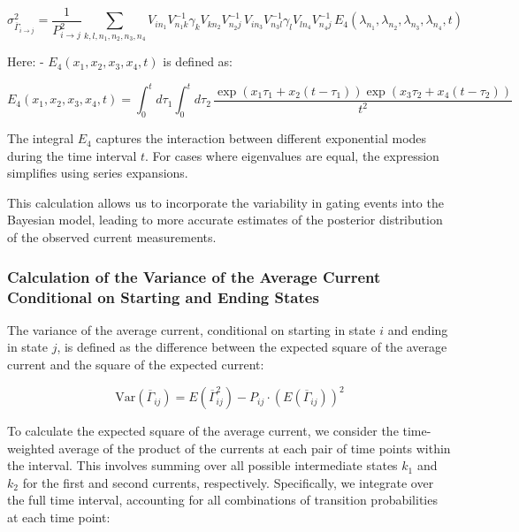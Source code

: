 \documentclass[pdflatex,sn-mathphys-num]{sn-jnl}%
\theoremstyle{thmstyleone}%
\theoremstyle{thmstyletwo}%
\theoremstyle{thmstylethree}%
\begin{document}
\begin{equation}
	\sigma^2_{\overline{\Gamma}_{i \rightarrow j}} = \frac{1}{P_{i \rightarrow j}^2} \sum_{k, l, n_1, n_2, n_3, n_4} V_{i n_1} V^{-1}_{n_1 k} \gamma_k V_{k n_2} V^{-1}_{n_2 j} \, V_{i n_3} V^{-1}_{n_3 l} \gamma_l V_{l n_4} V^{-1}_{n_4 j} \, E_4(\lambda_{n_1}, \lambda_{n_2}, \lambda_{n_3}, \lambda_{n_4}, t)
\end{equation}

Here:
- \( E_4(x_1, x_2, x_3, x_4, t) \) is defined as:

\begin{equation}
	E_4(x_1, x_2, x_3, x_4, t) = \int_0^t d\tau_1 \int_0^t d\tau_2 \, \frac{\exp(x_1 \tau_1 + x_2 (t-\tau_1)) \exp(x_3 \tau_2 + x_4 (t-\tau_2))}{t^2}
\end{equation}

The integral \( E_4 \) captures the interaction between different exponential modes during the time interval \( t \). For cases where eigenvalues are equal, the expression simplifies using series expansions.

This calculation allows us to incorporate the variability in gating events into the Bayesian model, leading to more accurate estimates of the posterior distribution of the observed current measurements.



\subsubsection{Calculation of the Variance of the Average Current Conditional on Starting and Ending States}

The variance of the average current, conditional on starting in state \(i\) and ending in state \(j\), is defined as the difference between the expected square of the average current and the square of the expected current:

\begin{equation}
	\text{Var}(\overline{\Gamma}_{ij}) = E(\overline{\Gamma}_{ij}^2) - P_{ij} \cdot (E(\overline{\Gamma}_{ij}))^2
\end{equation}

To calculate the expected square of the average current, we consider the time-weighted average of the product of the currents at each pair of time points within the interval. This involves summing over all possible intermediate states \(k_1\) and \(k_2\) for the first and second currents, respectively. Specifically, we integrate over the full time interval, accounting for all combinations of transition probabilities at each time point:
\end{document}
